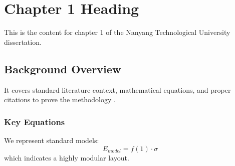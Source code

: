 \chapter{Chapter 1 Heading}
\label{ch:chapter1}
This is the content for chapter 1 of the Nanyang Technological University dissertation.

\section{Background Overview}
It covers standard literature context, mathematical equations, and proper citations to prove the methodology \cite{texbook}.

\subsection{Key Equations}
We represent standard models:
\begin{equation}
    E_{model} = f(1) \cdot \sigma
\end{equation}
which indicates a highly modular layout.

